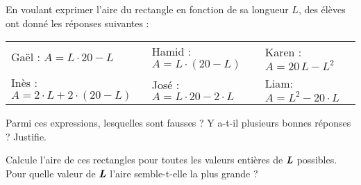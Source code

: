 \begin{activite}
\begin{partie}
En voulant exprimer l'aire du rectangle en fonction de sa longueur $L$, des élèves ont donné les réponses suivantes :
\begin{center}
 \begin{tabularx}{1.1\linewidth}{X|X|X}
  Gaël : $A = L \cdot 20 - L$ & Hamid : $A = L \cdot (20 - L)$ & Karen : $A = 20\,L - L^2$ \\
  Inès : $A = 2 \cdot L + 2 \cdot (20 - L)$ & José : $A = L \cdot 20 - 2 \cdot L$ & Liam: $A = L^2 - 20 \cdot L$ \\
  \end{tabularx}   
 \end{center}
 \vspace{0.3cm}
Parmi ces expressions, lesquelles sont fausses ? Y a-t-il plusieurs bonnes réponses ? Justifie.
\end{partie}

\begin{partie}
Calcule l'aire de ces rectangles pour toutes les valeurs entières de $\emph{\textbf{L}}$ possibles. Pour quelle valeur de $\emph{\textbf{L}}$ l'aire semble-t-elle la plus grande ?
\end{partie}

\end{activite}
